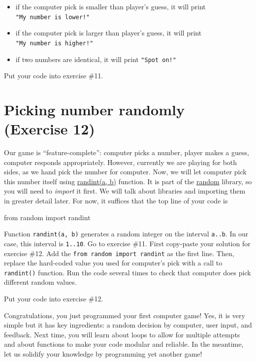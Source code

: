 \documentclass[
]{book}
\newenvironment{Shaded}{\begin{snugshade}}{\end{snugshade}}
\newcommand{\ImportTok}[1]{#1}
\newcommand{\NormalTok}[1]{#1}
\providecommand{\tightlist}{%
  \setlength{\itemsep}{0pt}\setlength{\parskip}{0pt}}
\begin{document}
\begin{itemize}
\tightlist
\item
  if the computer pick is smaller than player's guess, it will print \texttt{"My\ number\ is\ lower!"}
\item
  if the computer pick is larger than player's guess, it will print \texttt{"My\ number\ is\ higher!"}
\item
  if two numbers are identical, it will print \texttt{"Spot\ on!"}
\end{itemize}

Put your code into exercise \#11.

\hypertarget{picking-number-randomly-exercise-12}{%
\section{Picking number randomly (Exercise 12)}\label{picking-number-randomly-exercise-12}}

Our game is ``feature-complete'': computer picks a number, player makes a guess, computer responds appropriately. However, currently we are playing for both sides, as we hand pick the number for computer. Now, we will let computer pick this number itself using \href{https://docs.python.org/3/library/random.html\#random.randint}{randint(a, b)} function. It is part of the \href{https://docs.python.org/3/library/random.html}{random} library, so you will need to \emph{import} it first. We will talk about libraries and importing them in greater detail later. For now, it suffices that the top line of your code is

\begin{Shaded}
\begin{Highlighting}[]
\ImportTok{from}\NormalTok{ random }\ImportTok{import}\NormalTok{ randint}
\end{Highlighting}
\end{Shaded}

Function \texttt{randint(a,\ b)} generates a random integer on the interval \texttt{a..b}. In our case, this interval is \texttt{1..10}. Go to exercise \#11. First copy-paste your solution for exercise \#12. Add the \texttt{from\ random\ import\ randint} as the first line. Then, replace the hard-coded value you used for computer's pick with a call to \texttt{randint()} function. Run the code several times to check that computer does pick different random values.

Put your code into exercise \#12.

Congratulations, you just programmed your first computer game! Yes, it is very simple but it has key ingredients: a random decision by computer, user input, and feedback. Next time, you will learn about loops to allow for multiple attempts and about functions to make your code modular and reliable. In the meantime, let us solidify your knowledge by programming yet another game!
\end{document}
